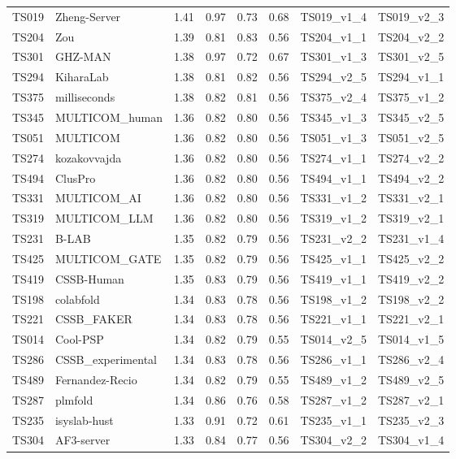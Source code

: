 \begin{table}[ht]
{\begin{tabular}{llllllll}
TS019 & Zheng-Server & 1.41 & 0.97 & 0.73 & 0.68 & TS019\_v1\_4 & TS019\_v2\_3 \\ 
TS204 & Zou & 1.39 & 0.81 & 0.83 & 0.56 & TS204\_v1\_1 & TS204\_v2\_2 \\ 
TS301 & GHZ-MAN & 1.38 & 0.97 & 0.72 & 0.67 & TS301\_v1\_3 & TS301\_v2\_5 \\ 
TS294 & KiharaLab & 1.38 & 0.81 & 0.82 & 0.56 & TS294\_v2\_5 & TS294\_v1\_1 \\ 
TS375 & milliseconds & 1.38 & 0.82 & 0.81 & 0.56 & TS375\_v2\_4 & TS375\_v1\_2 \\ 
TS345 & MULTICOM\_human & 1.36 & 0.82 & 0.80 & 0.56 & TS345\_v1\_3 & TS345\_v2\_5 \\ 
TS051 & MULTICOM & 1.36 & 0.82 & 0.80 & 0.56 & TS051\_v1\_3 & TS051\_v2\_5 \\ 
TS274 & kozakovvajda & 1.36 & 0.82 & 0.80 & 0.56 & TS274\_v1\_1 & TS274\_v2\_2 \\ 
TS494 & ClusPro & 1.36 & 0.82 & 0.80 & 0.56 & TS494\_v1\_1 & TS494\_v2\_2 \\ 
TS331 & MULTICOM\_AI & 1.36 & 0.82 & 0.80 & 0.56 & TS331\_v1\_2 & TS331\_v2\_1 \\ 
TS319 & MULTICOM\_LLM & 1.36 & 0.82 & 0.80 & 0.56 & TS319\_v1\_2 & TS319\_v2\_1 \\ 
TS231 & B-LAB & 1.35 & 0.82 & 0.79 & 0.56 & TS231\_v2\_2 & TS231\_v1\_4 \\ 
TS425 & MULTICOM\_GATE & 1.35 & 0.82 & 0.79 & 0.56 & TS425\_v1\_1 & TS425\_v2\_2 \\ 
TS419 & CSSB-Human & 1.35 & 0.83 & 0.79 & 0.56 & TS419\_v1\_1 & TS419\_v2\_2 \\ 
TS198 & colabfold & 1.34 & 0.83 & 0.78 & 0.56 & TS198\_v1\_2 & TS198\_v2\_2 \\ 
TS221 & CSSB\_FAKER & 1.34 & 0.83 & 0.78 & 0.56 & TS221\_v1\_1 & TS221\_v2\_1 \\ 
TS014 & Cool-PSP & 1.34 & 0.82 & 0.79 & 0.55 & TS014\_v2\_5 & TS014\_v1\_5 \\ 
TS286 & CSSB\_experimental & 1.34 & 0.83 & 0.78 & 0.56 & TS286\_v1\_1 & TS286\_v2\_4 \\ 
TS489 & Fernandez-Recio & 1.34 & 0.82 & 0.79 & 0.55 & TS489\_v1\_2 & TS489\_v2\_5 \\ 
TS287 & plmfold & 1.34 & 0.86 & 0.76 & 0.58 & TS287\_v1\_2 & TS287\_v2\_1 \\ 
TS235 & isyslab-hust & 1.33 & 0.91 & 0.72 & 0.61 & TS235\_v1\_1 & TS235\_v2\_3 \\ 
TS304 & AF3-server & 1.33 & 0.84 & 0.77 & 0.56 & TS304\_v2\_2 & TS304\_v1\_4 \\ 

\end{tabular}}
\end{table}
